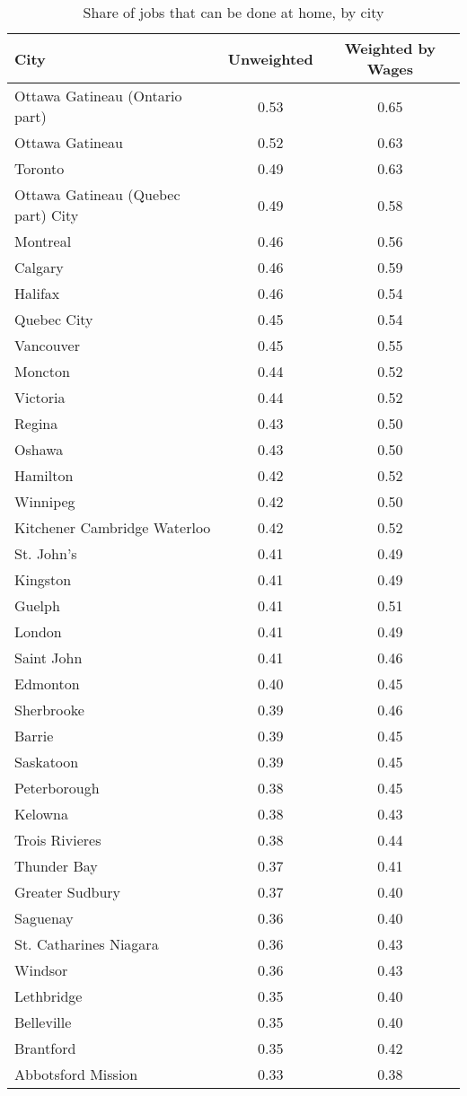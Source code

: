 \begin{table}[ht]
\centering
\caption{Share of jobs that can be done at home, by city} 
\label{tab:cities}
\begin{tabular}{lcc}
  \hline
City & Unweighted & Weighted by Wages \\ 
  \hline
Ottawa   Gatineau (Ontario part) & 0.53 & 0.65 \\ 
  Ottawa   Gatineau & 0.52 & 0.63 \\ 
  Toronto & 0.49 & 0.63 \\ 
  Ottawa   Gatineau (Quebec part) City & 0.49 & 0.58 \\ 
  Montreal & 0.46 & 0.56 \\ 
  Calgary & 0.46 & 0.59 \\ 
  Halifax & 0.46 & 0.54 \\ 
  Quebec City & 0.45 & 0.54 \\ 
  Vancouver & 0.45 & 0.55 \\ 
  Moncton & 0.44 & 0.52 \\ 
  Victoria & 0.44 & 0.52 \\ 
  Regina & 0.43 & 0.50 \\ 
  Oshawa & 0.43 & 0.50 \\ 
  Hamilton & 0.42 & 0.52 \\ 
  Winnipeg & 0.42 & 0.50 \\ 
  Kitchener   Cambridge   Waterloo & 0.42 & 0.52 \\ 
  St. John's & 0.41 & 0.49 \\ 
  Kingston & 0.41 & 0.49 \\ 
  Guelph & 0.41 & 0.51 \\ 
  London & 0.41 & 0.49 \\ 
  Saint John & 0.41 & 0.46 \\ 
  Edmonton & 0.40 & 0.45 \\ 
  Sherbrooke & 0.39 & 0.46 \\ 
  Barrie & 0.39 & 0.45 \\ 
  Saskatoon & 0.39 & 0.45 \\ 
  Peterborough & 0.38 & 0.45 \\ 
  Kelowna & 0.38 & 0.43 \\ 
  Trois Rivieres & 0.38 & 0.44 \\ 
  Thunder Bay & 0.37 & 0.41 \\ 
  Greater Sudbury & 0.37 & 0.40 \\ 
  Saguenay & 0.36 & 0.40 \\ 
  St. Catharines   Niagara & 0.36 & 0.43 \\ 
  Windsor & 0.36 & 0.43 \\ 
  Lethbridge & 0.35 & 0.40 \\ 
  Belleville & 0.35 & 0.40 \\ 
  Brantford & 0.35 & 0.42 \\ 
  Abbotsford   Mission & 0.33 & 0.38 \\ 
   \hline
\end{tabular}
\end{table}
